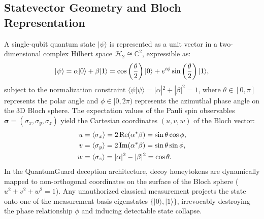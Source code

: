 \documentclass[journal,10pt]{IEEEtran}
\makeatletter
\let\orig@label\label
\def\label#1{%
  \orig@label{#1}%
  \pdfdest name{ref.#1} fith\relax
}
\makeatother
\begin{document}
\subsection{Statevector Geometry and Bloch Representation}
A single-qubit quantum state $|\psi\rangle$ is represented as a unit vector in a two-dimensional complex Hilbert space $\mathcal{H}_2 \cong \mathbb{C}^2$, expressible as:
\begin{equation}
  |\psi\rangle = \alpha |0\rangle + \beta |1\rangle = \cos\left(\frac{\theta}{2}\right) |0\rangle + e^{i\phi}\sin\left(\frac{\theta}{2}\right) |1\rangle,
  \label{eq:state_bloch}
\end{equation}
subject to the normalization constraint $\langle \psi | \psi \rangle = |\alpha|^2 + |\beta|^2 = 1$, where $\theta \in [0, \pi]$ represents the polar angle and $\phi \in [0, 2\pi)$ represents the azimuthal phase angle on the 3D Bloch sphere. The expectation values of the Pauli spin observables $\boldsymbol{\sigma} = (\sigma_x, \sigma_y, \sigma_z)$ yield the Cartesian coordinates $(u, v, w)$ of the Bloch vector:
\begin{align}
  u &= \langle \sigma_x \rangle = 2\operatorname{Re}(\alpha^*\beta) = \sin\theta \cos\phi, \label{eq:u_coord} \\
  v &= \langle \sigma_y \rangle = 2\operatorname{Im}(\alpha^*\beta) = \sin\theta \sin\phi, \label{eq:v_coord} \\
  w &= \langle \sigma_z \rangle = |\alpha|^2 - |\beta|^2 = \cos\theta. \label{eq:w_coord}
\end{align}
In the QuantumGuard deception architecture, decoy honeytokens are dynamically mapped to non-orthogonal coordinates on the surface of the Bloch sphere ($u^2 + v^2 + w^2 = 1$). Any unauthorized classical measurement projects the state onto one of the measurement basis eigenstates $\{|0\rangle, |1\rangle\}$, irrevocably destroying the phase relationship $\phi$ and inducing detectable state collapse.
\end{document}
